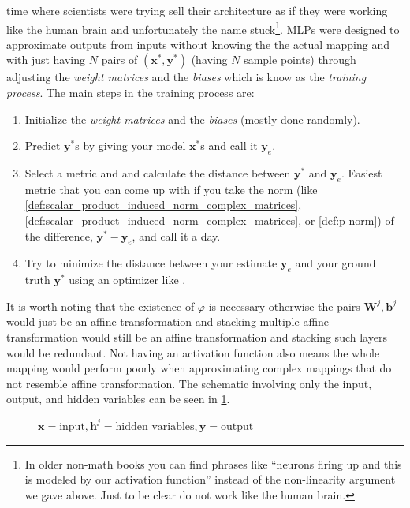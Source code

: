 time where scientists were trying sell their architecture as if they were working like the human brain and unfortunately the name stuck\footnote{
  In older non-math books you can find phrases like ``neurons firing up and this is modeled by our activation function'' 
  instead of the non-linearity argument we gave above. Just to be clear \nns do not work like the human brain.
}.
\ac{MLP}s were designed to approximate outputs from inputs without knowing the the actual mapping 
and with just having $N$ pairs of $\left(\boldsymbol{x}^*,\boldsymbol{y}^*\right)$ (having $N$ sample points) through adjusting the \emph{weight matrices} and the \emph{biases} which is know as the \emph{training process}. 
The main steps in the training process are:
\begin{enumerate}
  \item Initialize the \emph{weight matrices} and the \emph{biases} (mostly done randomly).
  \item Predict $\boldsymbol{y}^*$s by giving your model $\boldsymbol{x}^*$s and call it $\boldsymbol{y}_e$.
  \item Select a metric\cite{Alt2016} and and calculate the distance between $\boldsymbol{y}^*$ and $\boldsymbol{y}_e$. Easiest metric that 
  you can come up with if you take the norm (like \cref{def:scalar_product_induced_norm_complex_matrices}, \cref{def:scalar_product_induced_norm_complex_matrices}, or \cref{def:p-norm}) 
  of the difference, $\boldsymbol{y}^* - \boldsymbol{y}_e$, and call it a day.
  \item Try to minimize the distance between your estimate $\boldsymbol{y}_e$ and your ground truth $\boldsymbol{y}^*$ using an optimizer like \adam\cite{Kingma2014}.
\end{enumerate}  
It is worth noting that the existence of $\varphi$ is necessary otherwise the pairs $\boldsymbol{W}^j,\boldsymbol{b}^j$ would 
just be an affine transformation and stacking multiple affine transformation would still be an affine transformation and stacking 
such layers would be redundant. Not having an activation function also means the whole mapping would perform poorly when approximating 
complex mappings that do not resemble affine transformation. The schematic involving only the input, output, and hidden variables can be seen 
in \cref{fig:multi_layer_perceptron}.
\begin{figure}
  \centering
  \resizebox{0.7\textwidth}{!}{}
  \caption{$\boldsymbol{x} =\text{input},\boldsymbol{h}^j=\text{hidden variables},\boldsymbol{y}=\text{output}$}
  \label{fig:multi_layer_perceptron}
\end{figure}
